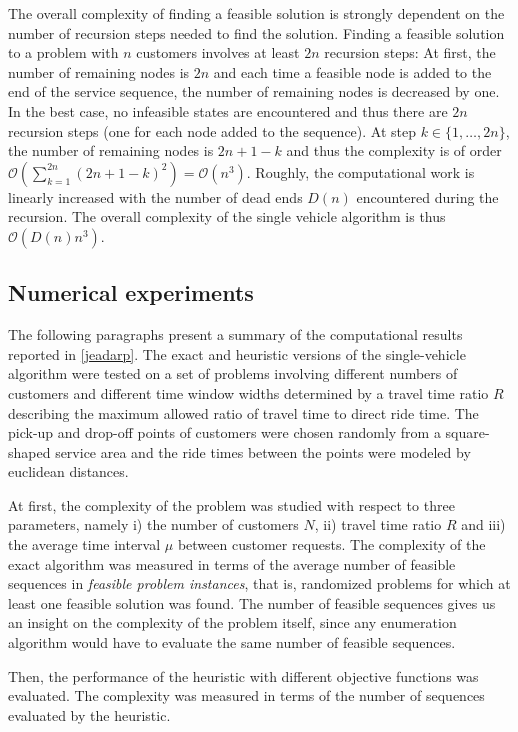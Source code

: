 \documentclass[dissertation,draft*]{aaltoseries}
\begin{document}
The overall complexity of finding a feasible solution is strongly dependent on the number of recursion
steps needed to find the solution. 
Finding a feasible solution to a problem with $n$ customers involves at least $2n$
recursion steps: At first, the number of remaining nodes is $2n$ and each time 
a feasible node is added to the end of the service sequence, the 
number of remaining nodes is decreased by one.
In the best case, no infeasible states are encountered and thus there are $2n$ recursion steps 
(one for each node added to the sequence).
At step $k \in \{1,\ldots,2n\}$, the number of remaining nodes is $2n+1-k$
and thus the complexity is of order $\mathcal{O} (\sum_{k=1}^{2n} (2n+1-k)^2) =\mathcal{O}(n^3)$.
Roughly, the computational work is linearly increased with the 
number of dead ends $D(n)$ encountered during the recursion.
The overall complexity of the single vehicle algorithm is thus $\mathcal{O}(D(n)n^3)$.


\subsection{Numerical experiments}
\label{svexperience}
The following paragraphs present a summary of the computational results reported in \ref{jeadarp}. 
The exact and heuristic versions of the single-vehicle algorithm
were tested on a set of problems involving different numbers of customers and different time
window widths determined by a travel time ratio $R$ describing the maximum allowed ratio of travel time
to direct ride time. The pick-up and drop-off points of customers were chosen randomly from a
square-shaped service area and the ride times between the points were modeled by euclidean distances.

At first, the complexity of the problem was studied with respect to three parameters, namely
i) the number of customers $N$, ii) travel time ratio $R$ and iii) the average time interval $\mu$
between customer requests. The complexity of the exact algorithm was measured in terms of the
average number of feasible sequences
in \emph{feasible problem instances}, that is, randomized
problems for which at least one feasible solution was found. 
The number of feasible sequences gives us an insight on the complexity of the problem itself,
since any enumeration algorithm would have to evaluate the same number of feasible sequences.

Then, the performance of the heuristic with different objective functions was evaluated.
The complexity was measured in terms of the number of sequences evaluated by the heuristic.
\end{document}
